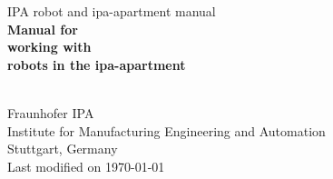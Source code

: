 %
%
	\begin{titlepage}
\vspace*{13mm}
\begin{center}
  \vspace{10mm} 
         {\large \hspace{20mm} IPA robot and ipa-apartment manual\\}
  \vspace{10mm}
       {\Large
          \bf
          \hspace{20mm} Manual for\\}
  \vspace{5mm}
       {\Large
          \bf
          \hspace{20mm} working with\\}
  \vspace{5mm}
       {\Large
          \bf
          \hspace{20mm} robots in the ipa-apartment\\}

  \vspace{80mm}
  \makebox[40mm]{}\\
  \vspace{10mm}
         {\large \hspace{20mm} Fraunhofer IPA} \\
  \vspace{5mm}
         {\large \hspace{20mm} Institute for Manufacturing Engineering and Automation} \\
         {\large \hspace{20mm} Stuttgart, Germany} \\
  \vfill
         {\large \hspace{20mm} Last modified on \today}
\end{center}
\end{titlepage}

\clearpage
\thispagestyle{empty}
\cleardoublepage